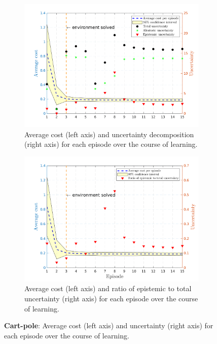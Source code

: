 \begin{figure}[H]    
  \begin{subfigure}[b]{1\linewidth}
    \centering
    \includegraphics[height=0.4\textheight,width=1\textwidth]{Chapter3/Figures/cp_uncertainty.png} 
    \caption{Average cost (left axis) and uncertainty decomposition (right axis) for each episode over the course of learning.} 
    \label{Fig:Re-cp-uncertainty} 
  \end{subfigure}
  
  \begin{subfigure}[b]{1\linewidth}
    \centering
    \includegraphics[height=0.4\textheight,width=1\textwidth]{Chapter3/Figures/cp_uncertainty_norm.png} 
    \caption{Average cost (left axis) and ratio of epistemic to total uncertainty (right axis) for each episode over the course of learning.} 
    \label{Fig:Re-cp-uncertainty-norm} 
  \end{subfigure}  
\caption[Uncertainty decomposition for \textbf{cart-pole} environment]{\textbf{Cart-pole}: Average cost (left axis) and uncertainty (right axis) for each episode over the course of learning.}
\label{Fig:Re-cp-full-uncertainty} 
\end{figure}
 
